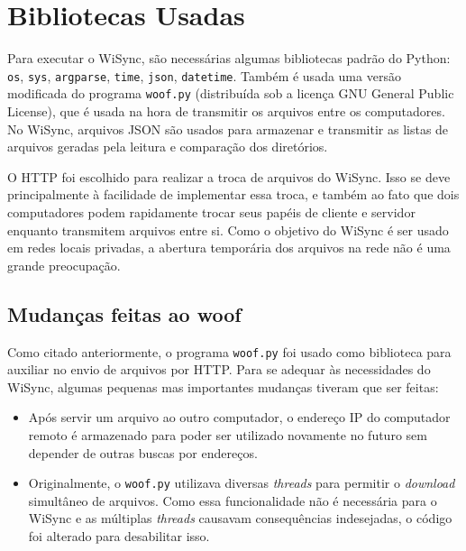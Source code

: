 \documentclass[12pt,a4paper]{ufpr}
\begin{document}
\section{Bibliotecas Usadas}
Para executar o WiSync, são necessárias algumas bibliotecas padrão do Python: \texttt{os}, \texttt{sys}, \texttt{argparse}, \texttt{time}, \texttt{json}, \texttt{datetime}.
Também é usada uma versão modificada do programa \texttt{woof.py} \cite{woof} (distribuída sob a licença GNU General Public License), que é usada na hora de transmitir os arquivos entre os computadores.
No WiSync, arquivos JSON são usados para armazenar e transmitir as listas de arquivos geradas pela leitura e comparação dos diretórios.

O HTTP foi escolhido para realizar a troca de arquivos do WiSync.
Isso se deve principalmente à facilidade de implementar essa troca, e também ao fato que dois computadores podem rapidamente trocar seus papéis de cliente e servidor enquanto transmitem arquivos entre si.
Como o objetivo do WiSync é ser usado em redes locais privadas, a abertura temporária dos arquivos na rede não é uma grande preocupação.

\subsection{Mudanças feitas ao woof}
Como citado anteriormente, o programa \texttt{woof.py} \cite{woof} foi usado como biblioteca para auxiliar no envio de arquivos por HTTP.
Para se adequar às necessidades do WiSync, algumas pequenas mas importantes mudanças tiveram que ser feitas:
\begin{itemize}
  \item Após servir um arquivo ao outro computador, o endereço IP do computador remoto é armazenado para poder ser utilizado novamente no futuro sem depender de outras buscas por endereços.
  \item Originalmente, o \texttt{woof.py} utilizava diversas \textit{threads} para permitir o \textit{download} simultâneo de arquivos. Como essa funcionalidade não é necessária para o WiSync e as múltiplas \textit{threads} causavam consequências indesejadas, o código foi alterado para desabilitar isso. 
\end{itemize}
\end{document}

